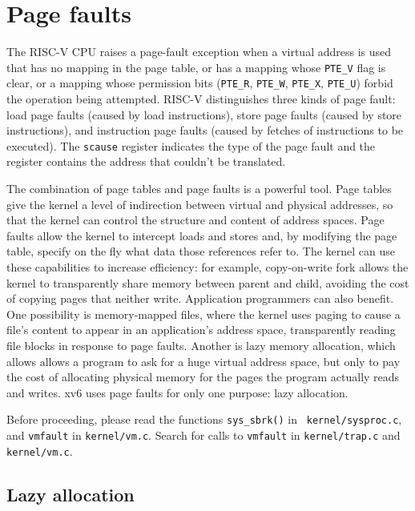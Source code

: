 \chapter{Page faults}
\label{CH:PGFAULTS}

The RISC-V CPU raises a page-fault exception
when a virtual address is used that has no mapping
in the page table, or has a mapping whose \lstinline{PTE_V}
flag is clear, or a mapping whose permission bits
(\lstinline{PTE_R},
\lstinline{PTE_W},
\lstinline{PTE_X},
\lstinline{PTE_U})
forbid the operation being attempted.
RISC-V distinguishes three
kinds of page fault: load page faults (caused by load instructions),
store page faults (caused by store instructions),
and instruction
page faults (caused by fetches of instructions to be executed).  The
\lstinline{scause} register indicates the type of the
page fault and the  register contains the address
that couldn't be translated.

The combination of page tables and page faults is a powerful tool.
Page tables give the kernel a level of indirection between virtual and
physical addresses, so that the kernel can control the structure and
content of address spaces. Page faults allow the kernel to intercept
loads and stores and, by modifying the page table, specify on the fly
what data those references refer to. The kernel can use these
capabilities to increase efficiency: for example, copy-on-write fork
allows the kernel to transparently share memory between parent and
child, avoiding the cost of copying pages that neither write.
Application programmers can also benefit. One possibility is
memory-mapped files, where the kernel uses paging to cause a file's
content to appear in an application's address space, transparently
reading file blocks in response to page faults. Another is lazy memory
allocation, which allows allows a program to ask for a huge virtual
address space, but only to pay the cost of allocating physical memory
for the pages the program actually reads and writes. xv6 uses page
faults for only one purpose: lazy allocation.

Before proceeding, please read the functions {\tt sys\_sbrk()} in {\tt
  kernel/sysproc.c}, and {\tt vmfault} in {\tt kernel/vm.c}.
Search for calls to {\tt vmfault} in {\tt kernel/trap.c} and {\tt
kernel/vm.c}.

\section{Lazy allocation}
\label{sec:lazy}

